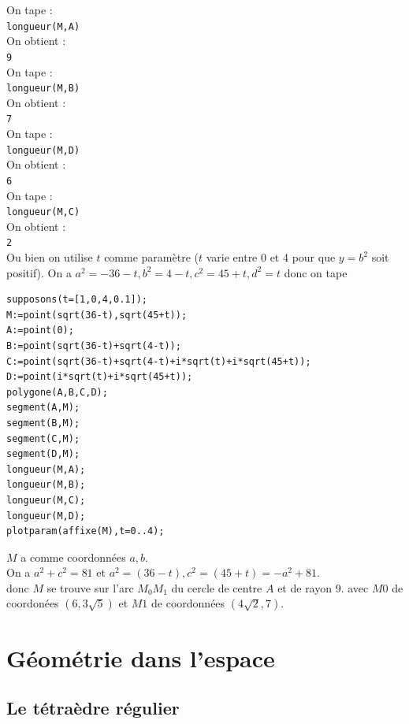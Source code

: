 \documentclass[a4paper,11pt]{book}
\begin{document}
On tape :\\
{\tt longueur(M,A)}\\
On obtient :\\
{\tt 9}\\
On tape :\\
{\tt longueur(M,B)}\\
On obtient :\\
{\tt 7}\\
On tape :\\
{\tt longueur(M,D)}\\
On obtient :\\
{\tt 6}\\
On tape :\\
{\tt longueur(M,C)}\\
On obtient :\\
{\tt 2}\\

Ou bien on utilise $t$ comme param\`etre ($t$ varie entre 0 et 4 pour que 
$y=b^2$ soit positif).
On a $a^2=-36-t,b^2=4-t,c^2=45+t,d^2=t$ donc on tape
\begin{verbatim}
supposons(t=[1,0,4,0.1]);
M:=point(sqrt(36-t),sqrt(45+t));
A:=point(0);
B:=point(sqrt(36-t)+sqrt(4-t));
C:=point(sqrt(36-t)+sqrt(4-t)+i*sqrt(t)+i*sqrt(45+t));
D:=point(i*sqrt(t)+i*sqrt(45+t));
polygone(A,B,C,D);
segment(A,M);
segment(B,M);
segment(C,M);
segment(D,M);
longueur(M,A);
longueur(M,B);
longueur(M,C);
longueur(M,D);
plotparam(affixe(M),t=0..4);
\end{verbatim}
$M$ a comme coordonn\'ees $a,b$.\\
On a $a^2+c^2=81$ et $a^2=(36-t),c^2=(45+t)=-a^2+81$.\\
donc $M$ se trouve sur l'arc $M_0M_1$ du cercle de centre $A$ et 
de rayon 9. avec $M0$ de coordon\'ees $(6,3\sqrt 5)$ et $M1$ de coordonn\'ees 
$(4\sqrt 2,7)$.

\chapter{G\'eom\'etrie dans l'espace}
\section{Le t\'etra\`edre r\'egulier}
\end{document}
